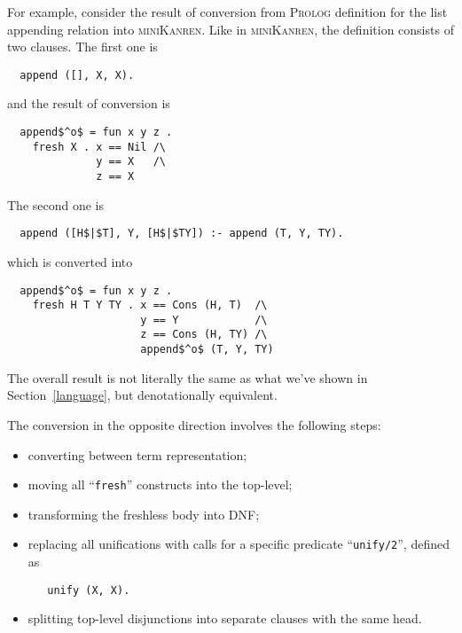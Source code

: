 For example, consider the result of conversion from \textsc{Prolog} definition for the list appending relation into \textsc{miniKanren}.
Like in \textsc{miniKanren}, the definition consists of two clauses. The first one is

\begin{lstlisting}
  append ([], X, X).
\end{lstlisting}

and the result of conversion is

\begin{lstlisting}
  append$^o$ = fun x y z .
    fresh X . x == Nil /\
              y == X   /\
              z == X
\end{lstlisting}

The second one is

\begin{lstlisting}
  append ([H$|$T], Y, [H$|$TY]) :- append (T, Y, TY).
\end{lstlisting}

which is converted into

\begin{lstlisting}
  append$^o$ = fun x y z .
    fresh H T Y TY . x == Cons (H, T)  /\
                     y == Y            /\
                     z == Cons (H, TY) /\
                     append$^o$ (T, Y, TY)
\end{lstlisting}

The overall result is not literally the same as what we've shown in Section~\ref{language}, but denotationally equivalent.

The conversion in the opposite direction involves the following steps:

\begin{itemize}
  \item converting between term representation;
  \item moving all ``\lstinline|fresh|'' constructs into the top-level;
  \item transforming the freshless body into DNF;
  \item replacing all unifications with calls for a specific predicate ``\lstinline|unify/2|'', defined as

\begin{lstlisting}
   unify (X, X).
\end{lstlisting}    

  \item splitting top-level disjunctions into separate clauses with the same head.
\end{itemize}

